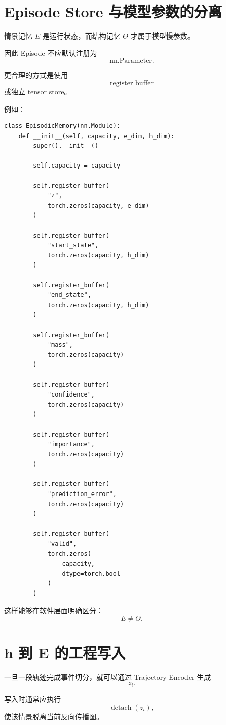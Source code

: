 \section{Episode Store 与模型参数的分离}

情景记忆 $E$ 是运行状态，而结构记忆 $\Theta$ 才属于模型慢参数。

因此 Episode 不应默认注册为
\[
\mathrm{nn.Parameter}.
\]

更合理的方式是使用
\[
\mathrm{register\_buffer}
\]
或独立 tensor store。

例如：

\begin{verbatim}
class EpisodicMemory(nn.Module):
    def __init__(self, capacity, e_dim, h_dim):
        super().__init__()

        self.capacity = capacity

        self.register_buffer(
            "z",
            torch.zeros(capacity, e_dim)
        )

        self.register_buffer(
            "start_state",
            torch.zeros(capacity, h_dim)
        )

        self.register_buffer(
            "end_state",
            torch.zeros(capacity, h_dim)
        )

        self.register_buffer(
            "mass",
            torch.zeros(capacity)
        )

        self.register_buffer(
            "confidence",
            torch.zeros(capacity)
        )

        self.register_buffer(
            "importance",
            torch.zeros(capacity)
        )

        self.register_buffer(
            "prediction_error",
            torch.zeros(capacity)
        )

        self.register_buffer(
            "valid",
            torch.zeros(
                capacity,
                dtype=torch.bool
            )
        )
\end{verbatim}

这样能够在软件层面明确区分：
\[
\boxed{
E
\neq
\Theta.
}
\]

\section{h 到 E 的工程写入}

一旦一段轨迹完成事件切分，就可以通过 Trajectory Encoder 生成
\[
z_i.
\]

写入时通常应执行
\[
\operatorname{detach}(z_i),
\]
使该情景脱离当前反向传播图。

